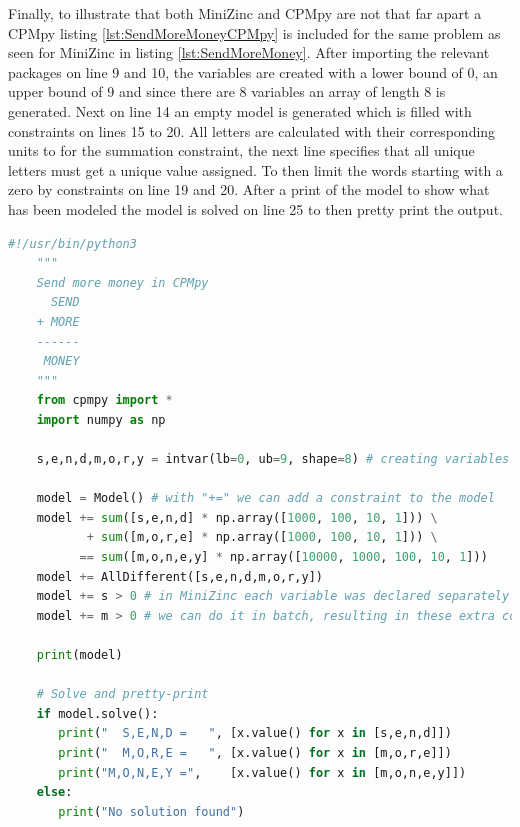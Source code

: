 Finally, to illustrate that both MiniZinc and CPMpy are not that far apart a CPMpy listing \ref{lst:SendMoreMoneyCPMpy} is included for the same problem as seen for MiniZinc in listing \ref{lst:SendMoreMoney}. After importing the relevant packages on line 9 and 10, the variables are created with a lower bound of 0, an upper bound of 9 and since there are 8 variables an array of length 8 is generated. Next on line 14 an empty model is generated which is filled with constraints on lines 15 to 20. All letters are calculated with their corresponding units to for the summation constraint, the next line specifies that all unique letters must get a unique value assigned. To then limit the words starting with a zero by constraints on line 19 and 20. After a print of the model to show what has been modeled the model is solved on line 25 to then pretty print the output.


\begin{lstlisting}[language=python, label={lst:SendMoreMoneyCPMpy},  caption={Solution to the puzzle "send more money". Modified from the example in the CPMpy repository \url{https://github.com/CPMpy/cpmpy/blob/master/examples/send_more_money.py}}]
	#!/usr/bin/python3
	"""
	Send more money in CPMpy
	  SEND
	+ MORE
	------
	 MONEY
	"""
	from cpmpy import *
	import numpy as np
	
	s,e,n,d,m,o,r,y = intvar(lb=0, ub=9, shape=8) # creating variables
	
	model = Model() # with "+=" we can add a constraint to the model
	model += sum([s,e,n,d] * np.array([1000, 100, 10, 1])) \
	       + sum([m,o,r,e] * np.array([1000, 100, 10, 1])) \
	      == sum([m,o,n,e,y] * np.array([10000, 1000, 100, 10, 1]))
	model += AllDifferent([s,e,n,d,m,o,r,y])
	model += s > 0 # in MiniZinc each variable was declared separately in CPMpy 
	model += m > 0 # we can do it in batch, resulting in these extra constraints 
	
	print(model)
	
	# Solve and pretty-print
	if model.solve():
	   print("  S,E,N,D =   ", [x.value() for x in [s,e,n,d]])
	   print("  M,O,R,E =   ", [x.value() for x in [m,o,r,e]])
	   print("M,O,N,E,Y =",    [x.value() for x in [m,o,n,e,y]])
	else:
	   print("No solution found")
\end{lstlisting}



